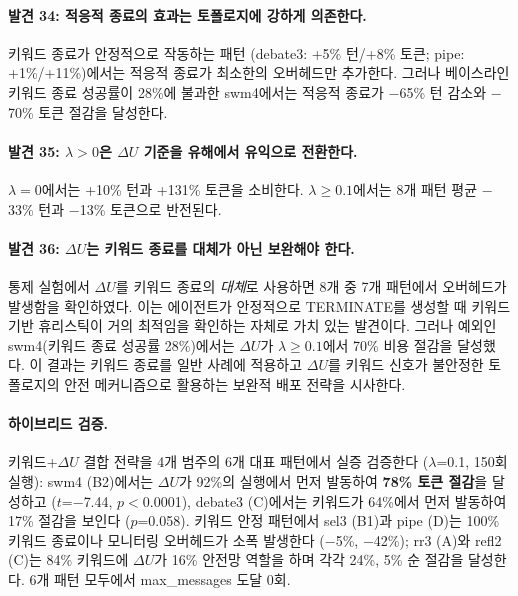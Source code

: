 \documentclass[a4paper,11pt]{article}
\begin{document}
\paragraph{발견 34: 적응적 종료의 효과는 토폴로지에 강하게 의존한다.}
키워드 종료가 안정적으로 작동하는 패턴 (debate3: +5\% 턴/+8\% 토큰; pipe: +1\%/+11\%)에서는 적응적 종료가 최소한의 오버헤드만 추가한다. 그러나 베이스라인 키워드 종료 성공률이 28\%에 불과한 swm4에서는 적응적 종료가 $-$65\% 턴 감소와 $-$70\% 토큰 절감을 달성한다.

\paragraph{발견 35: $\lambda > 0$은 $\Delta U$ 기준을 유해에서 유익으로 전환한다.}
$\lambda=0$에서는 +10\% 턴과 +131\% 토큰을 소비한다. $\lambda \geq 0.1$에서는 8개 패턴 평균 $-$33\% 턴과 $-$13\% 토큰으로 반전된다.

\paragraph{발견 36: $\Delta U$는 키워드 종료를 대체가 아닌 보완해야 한다.}
통제 실험에서 $\Delta U$를 키워드 종료의 \emph{대체}로 사용하면 8개 중 7개 패턴에서 오버헤드가 발생함을 확인하였다. 이는 에이전트가 안정적으로 TERMINATE를 생성할 때 키워드 기반 휴리스틱이 거의 최적임을 확인하는 자체로 가치 있는 발견이다. 그러나 예외인 swm4(키워드 종료 성공률 28\%)에서는 $\Delta U$가 $\lambda \geq 0.1$에서 70\% 비용 절감을 달성했다. 이 결과는 키워드 종료를 일반 사례에 적용하고 $\Delta U$를 키워드 신호가 불안정한 토폴로지의 안전 메커니즘으로 활용하는 보완적 배포 전략을 시사한다.

\paragraph{하이브리드 검증.} 키워드+$\Delta U$ 결합 전략을 4개 범주의 6개 대표 패턴에서 실증 검증한다 ($\lambda$=0.1, 150회 실행): swm4 (B2)에서는 $\Delta U$가 92\%의 실행에서 먼저 발동하여 \textbf{78\% 토큰 절감}을 달성하고 ($t$=$-$7.44, $p<$0.0001), debate3 (C)에서는 키워드가 64\%에서 먼저 발동하여 17\% 절감을 보인다 ($p$=0.058). 키워드 안정 패턴에서 sel3 (B1)과 pipe (D)는 100\% 키워드 종료이나 모니터링 오버헤드가 소폭 발생한다 ($-$5\%, $-$42\%); rr3 (A)와 refl2 (C)는 84\% 키워드에 $\Delta U$가 16\% 안전망 역할을 하며 각각 24\%, 5\% 순 절감을 달성한다. 6개 패턴 모두에서 max\_messages 도달 0회.

\end{document}
